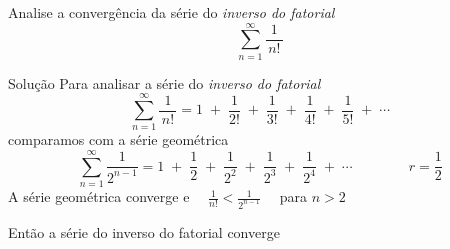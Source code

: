 \begin{question}
  Analise a convergência da série do \emph{inverso do fatorial}
  \[
    \sum_{n=1}^{\infty} \frac{1}{\,n!\,}
  \]
\end{question}

\begin{resolution}{Solução}
  Para analisar a série do \emph{inverso do fatorial}
  \[
    \sum_{n=1}^{\infty} \frac{1}{\,n!\,}
    = 1             \;+\;
      \frac{1}{2!}  \;+\;
      \frac{1}{3!}  \;+\;
      \frac{1}{4!}  \;+\;
      \frac{1}{5!}  \;+\;
      \cdots
  \]
  \pause
  comparamos com a série geométrica
  \[ \sum_{n=1}^{\infty} \frac{1}{2^{n-1}}
    = 1              \;+\;
      \frac{1}{2}    \;+\;
      \frac{1}{2^2}  \;+\;
      \frac{1}{2^3}  \;+\;
      \frac{1}{2^4}  \;+\;
      \cdots
      \qquad
      \qquad
      r=\frac{1}{2}
  \]
  \pause
  A série geométrica converge
  \pause
  e
  \(\quad \frac{1}{n!} < \frac{1}{2^{n-1}}\quad\)
  para $n>2$

  \pause
  \bigskip
  Então a série do inverso do fatorial converge
\end{resolution}

